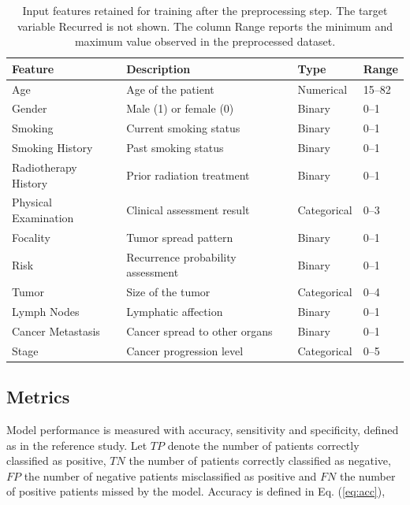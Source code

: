 \begin{table}[t]
\centering
\caption{Input features retained for training after the preprocessing step. The target variable Recurred is not shown. The column Range reports the minimum and maximum value observed in the preprocessed dataset.}
\label{tab:dataset}
\begin{tabular}{llll}
\hline
Feature & Description & Type & Range \\
\hline
Age                  & Age of the patient                  & Numerical   & 15--82 \\
Gender               & Male (1) or female (0)              & Binary      & 0--1   \\
Smoking              & Current smoking status              & Binary      & 0--1   \\
Smoking History      & Past smoking status                 & Binary      & 0--1   \\
Radiotherapy History & Prior radiation treatment           & Binary      & 0--1   \\
Physical Examination & Clinical assessment result          & Categorical & 0--3   \\
Focality             & Tumor spread pattern                & Binary      & 0--1   \\
Risk                 & Recurrence probability assessment   & Binary      & 0--1   \\
Tumor                & Size of the tumor                   & Categorical & 0--4   \\
Lymph Nodes          & Lymphatic affection                 & Binary      & 0--1   \\
Cancer Metastasis    & Cancer spread to other organs       & Binary      & 0--1   \\
Stage                & Cancer progression level            & Categorical & 0--5   \\
\hline
\end{tabular}
\end{table}

\subsection{Metrics}
\label{subsec:metrics}

Model performance is measured with accuracy, sensitivity and specificity, defined as in the reference study. Let $TP$ denote the number of patients correctly classified as positive, $TN$ the number of patients correctly classified as negative, $FP$ the number of negative patients misclassified as positive and $FN$ the number of positive patients missed by the model. Accuracy is defined in Eq. (\ref{eq:acc}),

